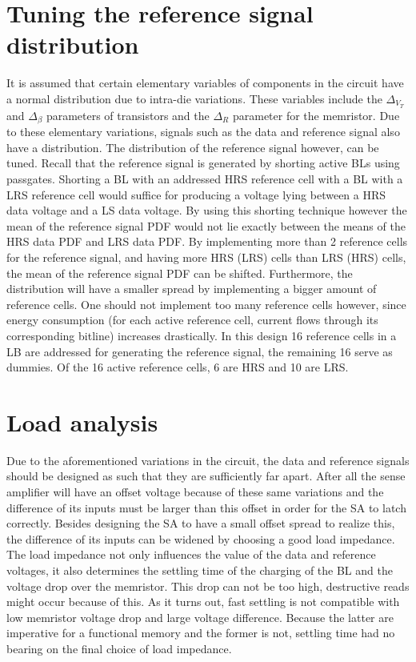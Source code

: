 \documentclass[journal]{IEEEtran}
\begin{document}
\section{Tuning the reference signal distribution}
It is assumed that certain elementary variables of components in the circuit have a normal distribution due to intra-die variations. These variables include the $\Delta_{V_{T}}$ and $\Delta_{\beta}$ parameters of transistors and the $\Delta_{R}$ parameter for the memristor. Due to these elementary variations, signals such as the data and reference signal also have a distribution. The distribution of the reference signal however, can be tuned. Recall that the reference signal is generated by shorting active BLs using passgates. Shorting a BL with an addressed HRS reference cell with a BL with a LRS reference cell would suffice for producing a voltage lying between a HRS data voltage and a LS data voltage. By using this shorting technique however the mean of the reference signal PDF would not lie exactly between the means of the HRS data PDF and LRS data PDF. By implementing more than 2 reference cells for the reference signal, and having more HRS (LRS) cells than LRS (HRS) cells, the mean of the reference signal PDF can be shifted. Furthermore, the distribution will have a smaller spread by implementing a bigger amount of reference cells. One should not implement too many reference cells however, since energy consumption (for each active reference cell, current flows through its corresponding bitline) increases drastically. In this design 16 reference cells in a LB are addressed for generating the reference signal, the remaining 16 serve as dummies. Of the 16 active reference cells, 6 are HRS and 10 are LRS.

\section{Load analysis}
Due to the aforementioned variations in the circuit, the data and reference signals should be designed as such that they are sufficiently far apart. After all the sense amplifier will have an offset voltage because of these same variations and the difference of its inputs must be larger than this offset in order for the SA to latch correctly. Besides designing the SA to have a small offset spread to realize this, the difference of its inputs can be widened by choosing a good load impedance. The load impedance not only influences the value of the data and reference voltages, it also determines the settling time of the charging of the BL and the voltage drop over the memristor. This drop can not be too high, destructive reads might occur because of this. As it turns out, fast settling is not compatible with low memristor voltage drop and large voltage difference. Because the latter are imperative for a functional memory and the former is not, settling time had no bearing on the final choice of load impedance.
\end{document}
